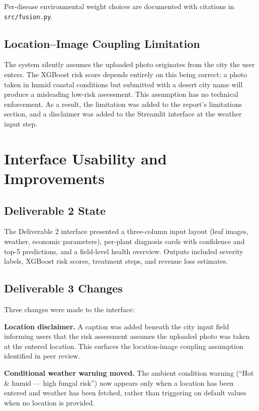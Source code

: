 \documentclass[conference]{IEEEtran}
\let\oldtexttt\texttt
\renewcommand{\texttt}[1]{{\small\oldtexttt{#1}}}
\begin{document}
Per-disease environmental weight choices are documented with citations in \texttt{src/fusion.py}.

\subsection{Location--Image Coupling Limitation}

The system silently assumes the uploaded photo originates from the city the user enters. The XGBoost risk score depends entirely on this being correct; a photo taken in humid coastal conditions but submitted with a desert city name will produce a misleading low-risk assessment. This assumption has no technical enforcement. As a result, the limitation was added to the report's limitations section, and a disclaimer was added to the Streamlit interface at the weather input step.

\section{Interface Usability and Improvements}

\subsection{Deliverable 2 State}

The Deliverable 2 interface presented a three-column input layout (leaf images, weather, economic parameters), per-plant diagnosis cards with confidence and top-5 predictions, and a field-level health overview. Outputs included severity labels, XGBoost risk scores, treatment steps, and revenue loss estimates.

\subsection{Deliverable 3 Changes}

Three changes were made to the interface:

\textbf{Location disclaimer.} A caption was added beneath the city input field informing users that the risk assessment assumes the uploaded photo was taken at the entered location. This surfaces the location-image coupling assumption identified in peer review.

\textbf{Conditional weather warning moved.} The ambient condition warning (``Hot \& humid --- high fungal risk'') now appears only when a location has been entered and weather has been fetched, rather than triggering on default values when no location is provided.
\end{document}
